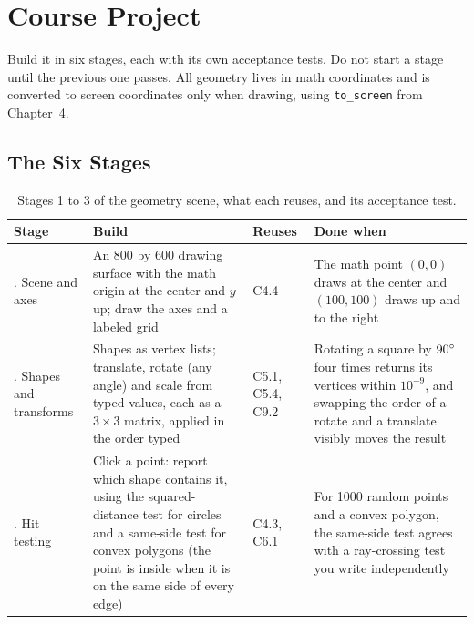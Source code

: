\chapter{Course Project}


Build it in six stages, each with its own acceptance tests. Do not start a stage until the previous one passes. All geometry lives in math coordinates and is converted to screen coordinates only when drawing, using \lstinline!to_screen! from Chapter~4.

\section{The Six Stages}

\begin{table}[H]
\centering
\footnotesize
\renewcommand{\arraystretch}{1.25}
\begin{tabularx}{\textwidth}{@{}>{\raggedright\arraybackslash}p{0.85in} >{\raggedright\arraybackslash}X >{\raggedright\arraybackslash}p{0.9in} >{\raggedright\arraybackslash}X@{}}
\toprule
\textbf{Stage} & \textbf{Build} & \textbf{Reuses} & \textbf{Done when} \\
\midrule
1. Scene and axes & An 800 by 600 drawing surface with the math origin at the center and $y$ up; draw the axes and a labeled grid & C4.4 & The math point $(0, 0)$ draws at the center and $(100, 100)$ draws up and to the right \\
2. Shapes and transforms & Shapes as vertex lists; translate, rotate (any angle) and scale from typed values, each as a $3 \times 3$ matrix, applied in the order typed & C5.1, C5.4, C9.2 & Rotating a square by $90^\circ$ four times returns its vertices within $10^{-9}$, and swapping the order of a rotate and a translate visibly moves the result \\
3. Hit testing & Click a point: report which shape contains it, using the squared-distance test for circles and a same-side test for convex polygons (the point is inside when it is on the same side of every edge) & C4.3, C6.1 & For 1000 random points and a convex polygon, the same-side test agrees with a ray-crossing test you write independently \\
\bottomrule
\end{tabularx}
\caption{Stages 1 to 3 of the geometry scene, what each reuses, and its acceptance test.}
\end{table}

